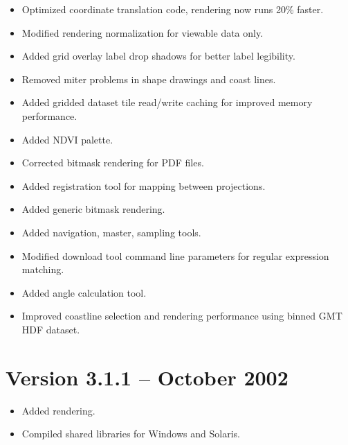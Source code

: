 \begin{itemize}

  \item Optimized coordinate translation code, rendering now runs 20\%
  faster.

  \item Modified rendering normalization for viewable data only.

  \item Added grid overlay label drop shadows for better label
  legibility.

  \item Removed miter problems in shape drawings and coast lines.

  \item Added gridded dataset tile read/write caching for improved
  memory performance.

  \item Added NDVI palette.

  \item Corrected bitmask rendering for PDF files.

  \item Added registration tool for mapping between projections.

  \item Added generic bitmask rendering.

  \item Added navigation, master, sampling tools.

  \item Modified download tool command line parameters for regular
  expression matching.

  \item Added angle calculation tool.

  \item Improved coastline selection and rendering performance using
  binned GMT HDF dataset.

\end{itemize}


\section{Version 3.1.1 -- October 2002}

\begin{itemize}

  \item Added rendering.

  \item Compiled shared libraries for Windows and Solaris.

\end{itemize}

